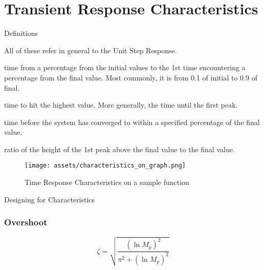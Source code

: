 \documentclass{../templates/topic}
\begin{document}
\chapter{Transient Response Characteristics}
\begin{section}{Definitions}
	
	All of these refer in general to the Unit Step Response.
	
	  time from a percentage from the initial values to the 1st time encountering a percentage from the final value. Most commonly, it is from 0.1 of initial to 0.9 of final.
	
	  time to hit the highest value. More generally, the time until the first peak.
	
	  time before the system has converged to within a specified percentage of the final value.
	
	 ratio of the height of the 1st peak above the final value to the final value.
	
	\begin{figure}[H]
		\texttt{[image: assets/characteristics\_on\_graph.png]}
		\caption{Time Response Characteristics on a sample function}
	\end{figure}
	
\end{section}

\begin{section}{Designing for Characteristics}
	\subsection{Overshoot}
		\begin{equation*}
			\zeta = \sqrt{\frac{(\ln{M_p})^2}{\pi^2+(\ln{M_p})^2}}
		\end{equation*}
	
\end{section}
\end{document}
